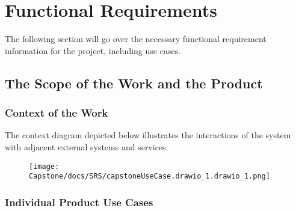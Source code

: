 \documentclass[12pt]{article}
\begin{document}
\section{Functional Requirements}
The following section will go over the necessary functional requirement information for the project, including use cases. 
\subsection{The Scope of the Work and the Product}
\subsubsection{Context of the Work}
The context diagram depicted below illustrates the interactions of the system with adjacent
external systems and services.
\begin{figure}[htbp]
\centerline{\texttt{[image: Capstone/docs/SRS/capstoneUseCase.drawio\_1.drawio\_1.png]}}
\label{UseCaseDiagram}
\end{figure}

\newpage
\subsubsection{Individual Product Use Cases}
\end{document}
